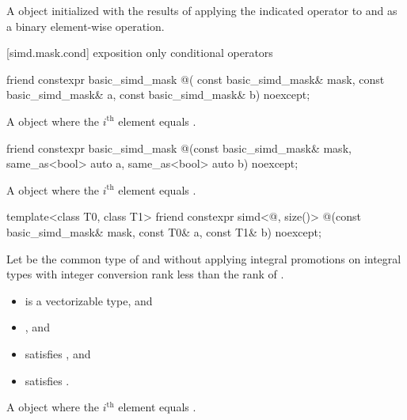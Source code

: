 \begin{itemdescr}
  \pnum\returns
  A  object initialized with the results of applying the indicated operator
  to  and  as a binary element-wise operation.
\end{itemdescr}

[simd.mask.cond]{ exposition only conditional operators}

\begin{itemdecl}
friend constexpr basic_simd_mask @\simdselect@(
  const basic_simd_mask& mask, const basic_simd_mask& a, const basic_simd_mask& b) noexcept;
\end{itemdecl}

\begin{itemdescr}
  \pnum\returns
  A  object where the $i^\text{th}$ element equals  \foralli.
\end{itemdescr}

\begin{itemdecl}
friend constexpr basic_simd_mask
@\simdselect@(const basic_simd_mask& mask, same_as<bool> auto a, same_as<bool> auto b) noexcept;
\end{itemdecl}

\begin{itemdescr}
  \pnum\returns
  A  object where the $i^\text{th}$ element equals 
  \foralli.
\end{itemdescr}

\begin{itemdecl}
template<class T0, class T1>
  friend constexpr simd<@\seebelow@, size()>
    @\simdselect@(const basic_simd_mask& mask, const T0& a, const T1& b) noexcept;
\end{itemdecl}

\begin{itemdescr}
  \pnum Let  be the common type of  and  without
  applying integral promotions on integral types with integer conversion rank
  less than the rank of .

  \pnum\constraints
  \begin{itemize}
    \item {} is a vectorizable type, and
    \item {}, and
    \item {} satisfies , and
    \item {} satisfies .
  \end{itemize}

  \pnum\returns
  A  object where the $i^\text{th}$ element equals  \foralli.
\end{itemdescr}

